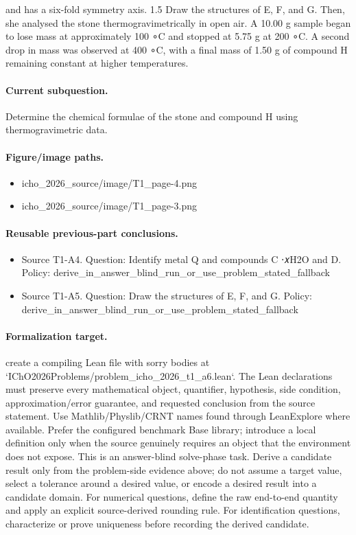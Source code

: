 and has a six-fold symmetry axis. 1.5 Draw the structures of E, F, and G. Then, she analysed the stone thermogravimetrically in open air. A 10.00 g sample began to lose mass at approximately 100 ∘C and stopped at 5.75 g at 200 ∘C. A second drop in mass was observed at 400 ∘C, with a final mass of 1.50 g of compound H remaining constant at higher temperatures.

\paragraph{Current subquestion.}
Determine the chemical formulae of the stone and compound H using thermogravimetric data.

\paragraph{Figure/image paths.}
\begin{itemize}
\item icho\_2026\_source/image/T1\_page-4.png
\item icho\_2026\_source/image/T1\_page-3.png
\end{itemize}

\paragraph{Reusable previous-part conclusions.}
\begin{itemize}
\item Source T1-A4. Question: Identify metal Q and compounds C ⋅𝑥H2O and D. Policy: derive\_in\_answer\_blind\_run\_or\_use\_problem\_stated\_fallback
\item Source T1-A5. Question: Draw the structures of E, F, and G. Policy: derive\_in\_answer\_blind\_run\_or\_use\_problem\_stated\_fallback
\end{itemize}

\paragraph{Formalization target.}
create a compiling Lean file with sorry bodies at `IChO2026Problems/problem\_icho\_2026\_t1\_a6.lean`.
The Lean declarations must preserve every mathematical object, quantifier, hypothesis, side condition, approximation/error guarantee, and requested conclusion from the source statement.
Use Mathlib/Physlib/CRNT names found through LeanExplore where available. Prefer the configured benchmark Base library; introduce a local definition only when the source genuinely requires an object that the environment does not expose.
This is an answer-blind solve-phase task. Derive a candidate result only from the problem-side evidence above; do not assume a target value, select a tolerance around a desired value, or encode a desired result into a candidate domain.
For numerical questions, define the raw end-to-end quantity and apply an explicit source-derived rounding rule. For identification questions, characterize or prove uniqueness before recording the derived candidate.

